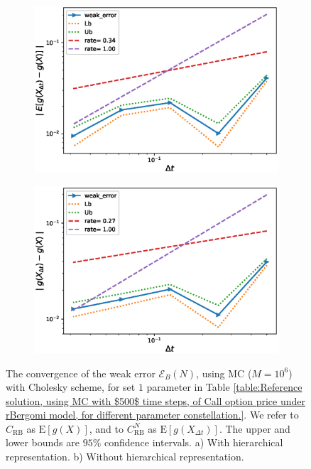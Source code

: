 \documentclass[11pt]{article}
\newcommand{\expt}[1]{\mathrm{E}\left[#1\right]}
\begin{document}
\FloatBarrier
\begin{figure}[h!]
	\centering
	\begin{subfigure}{.5\textwidth}
		\centering
		\includegraphics[width=1\linewidth]{./figures/rBergomi_weak_error_cholesky/weak_convergence_order_Bergomi_H_007_K_1_M_10_6_CI_relative_cholesky_hierarchical}
		\caption{}
		\label{fig:sub3}
	\end{subfigure}%
	\begin{subfigure}{.5\textwidth}
		\centering
		\includegraphics[width=1\linewidth]{./figures/rBergomi_weak_error_cholesky/weak_convergence_order_Bergomi_H_007_K_1_M_10_6_CI_relative_cholesky_non_hierarchical}
		\caption{}
		\label{fig:sub4}
	\end{subfigure}
	
	\caption{The  convergence of the weak error $\mathcal{E}_B(N)$, using MC ($M=10^6$) with Cholesky scheme, for set $1$ parameter in Table \ref{table:Reference solution, using MC with $500$ time steps, of Call option price under rBergomi model, for different parameter constellation.}. We refer to $C_{\text{RB}}$ as $\expt{g(X)}$, and to $C_{\text{RB}}^{N}$ as  $\expt{g(X_{\Delta t})}$. The upper and lower bounds are $95\%$ confidence intervals. a) With hierarchical representation.  b) Without hierarchical representation.}
	\label{fig:Weak_rate_set1_set_2_without_rich}
\end{figure}
\FloatBarrier
\end{document}
